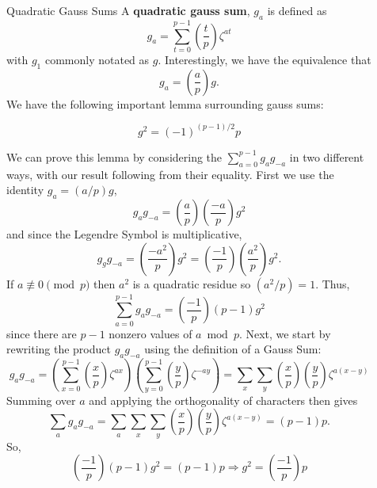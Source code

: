 \documentclass[final]{beamer}
\newlength{\sepwid}
\newlength{\onecolwid}
\newlength{\twocolwid}
\begin{document}
\begin{frame}[t]
\begin{columns}[t]
\begin{column}{\onecolwid}
    \end{column}
    

    \begin{column}{\sepwid}\end{column}			%
    
    \begin{column}{\twocolwid}
    \begin{block}{Quadratic Gauss Sums} 
        A \textbf{quadratic gauss sum}, $g_a$ is defined as 
        \[
            g_a = \sum_{t=0}^{p-1} \left(\frac{t}{p}\right)\zeta^{at}
        \]
        with $g_1$ commonly notated as $g$. Interestingly, we have the equivalence that 
        \[
            g_a = \left(\frac{a}{p}\right)g.
        \]
        We have the following important lemma surrounding gauss sums:
        \begin{tcolorbox}[title=Lemma]
            \[
                g^2 = (-1)^{(p-1)/2}p
            \]
        \end{tcolorbox}
        We can prove this lemma by considering the $\sum_{a=0}^{p-1}g_a g_{-a}$ in two different ways, with our result following from their equality. First we use the identity $g_a = (a/p)g$,
        \[
            g_a g_{-a} = \left(\frac{a}{p}\right)\left(\frac{-a}{p}\right)g^2
        \] 
        and since the Legendre Symbol is multiplicative, 
        \[
            g_g g_{-a} = \left(\frac{-a^2}{p}\right)g^2 = \left(\frac{-1}{p}\right)\left(\frac{a^2}{p}\right)g^2.
        \]
        If $a \not\equiv 0 \pmod p$ then $a^2$ is a quadratic residue so $(a^2/p) = 1$. Thus,
        \[
            \sum_{a=0}^{p-1}g_a g_{-a} = \left(\frac{-1}{p}\right)(p-1)g^2
        \]
        since there are $p-1$ nonzero values of $a \bmod p$. 
        Next, we start by rewriting the product $g_a g_{-a}$ using the definition of a Gauss Sum:
        \[
            g_a g_{-a} = \left(\sum_{x=0}^{p-1}\left(\frac{x}{p}\right)\zeta^{ax}\right) \left(\sum_{y=0}^{p-1}\left(\frac{y}{p}\right)\zeta^{-ay}\right) = \sum_x \sum_y \left(\frac{x}{p}\right)\left(\frac{y}{p}\right)\zeta^{a(x-y)}
        \]
        Summing over $a$ and applying the orthogonality of characters then gives
        \[
            \sum_{a}g_a g_{-a} = \sum_a \sum_x \sum_y \left(\frac{x}{p}\right)\left(\frac{y}{p}\right)\zeta^{a(x-y)} = (p-1)p.
        \]
        So, 
        \[
            \left(\frac{-1}{p}\right)(p-1)g^2 = (p-1)p \Rightarrow g^2 = \left(\frac{-1}{p}\right)p
\]
\end{block}
\end{column}
\end{columns}
\end{frame}
\end{document}
